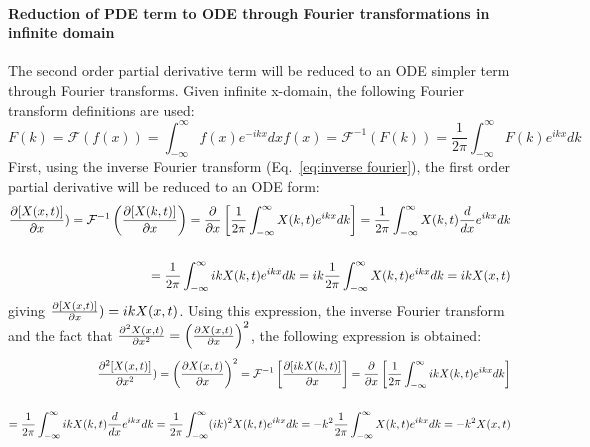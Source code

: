 \paragraph{Reduction of PDE term to ODE through Fourier transformations in infinite domain}
The second order partial derivative term will be reduced to an ODE simpler term through Fourier transforms.
Given infinite x-domain, the following Fourier transform definitions are used:
\begin{subequations}
    \begin{equation}
        F(k) = \mathcal{F}(f(x)) = \int_{-\infty}^{\infty} f(x)e^{-ikx} dx
    \end{equation}
    \begin{equation}
        f(x) = \mathcal{F}^{-1}(F(k)) = \frac{1}{2\pi}\int_{-\infty}^{\infty} F(k)e^{ikx} dk
        \label{eq:inverse fourier}
    \end{equation}
\end{subequations}
First, using the inverse Fourier transform (Eq.~\ref{eq:inverse fourier}), the first order partial derivative will be reduced to an ODE form:
\begin{equation}
    \begin{split}
        \pdv{[X(x,t)]}{x}) = \mathcal{F}^{-1}\left(\pdv{[X(k,t)]}{x}\right) = \frac{\partial}{\partial x}\left[\frac{1}{2\pi}\int_{-\infty}^{\infty} X(k,t)e^{ikx} dk\right] =  \frac{1}{2\pi}\int_{-\infty}^{\infty} X(k,t)\frac{d}{dx}e^{ikx} dk\\\\ =\frac{1}{2\pi}\int_{-\infty}^{\infty} ik X(k,t)e^{ikx} dk = ik \frac{1}{2\pi}\int_{-\infty}^{\infty} X(k,t)e^{ikx} dk = ik X(x,t)
    \end{split}
\end{equation}
giving $\pdv{[X(x,t)]}{x}) =  ik X(x,t)$.
Using this expression, the inverse Fourier transform and the fact that $\frac{\partial^{2} {X(x,t)}}{\partial {x}^{2}} =\left(\pdv{X(x,t)}{x}\right)^2$, the following expression is obtained:
\begin{equation}
    \begin{split}
        \frac{\partial^{2} {[X(x,t)]}}{\partial {x}^{2}}) = \left(\pdv{X(x,t)}{x}\right)^2 = \mathcal{F}^{-1}\left[\pdv{[ikX(k,t)]}{x}\right] = \frac{\partial}{\partial x}\left[\frac{1}{2\pi}\int_{-\infty}^{\infty} ikX(k,t)e^{ikx} dk\right] \\\\=  \frac{1}{2\pi}\int_{-\infty}^{\infty} ikX(k,t)\frac{d}{dx}e^{ikx} dk =\frac{1}{2\pi}\int_{-\infty}^{\infty} (ik)^2 X(k,t)e^{ikx} dk = -k^2 \frac{1}{2\pi}\int_{-\infty}^{\infty} X(k,t)e^{ikx} dk = -k^2 X(x,t)
    \end{split}
    \label{eq:fourier of our system}
\end{equation}
